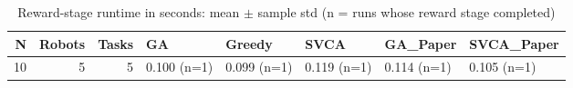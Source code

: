 \begin{table}[htbp]
\centering
\small
\caption{Reward-stage runtime in seconds: mean $\pm$ sample std (n = runs whose reward stage completed)}
\label{tab:research_smoke_c1_r1_20261122_reward_runtime}
\begin{tabular}{rrrlllll}
\hline
N & Robots & Tasks & GA & Greedy & SVCA & GA\_Paper & SVCA\_Paper \\
\hline
10 & 5 & 5 & 0.100 (n=1) & 0.099 (n=1) & 0.119 (n=1) & 0.114 (n=1) & 0.105 (n=1) \\
\hline
\end{tabular}
\end{table}
